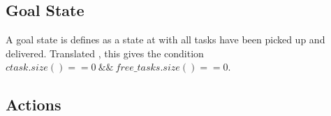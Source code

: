 \documentclass[11pt]{article}
\begin{document}

\subsection{Goal State}
A goal state is defines as a state at with all tasks have been picked up and delivered. Translated , this gives the condition $ctask.size() == 0\ \&\&\ free\_tasks.size() == 0$. 

\subsection{Actions}
\end{document}
